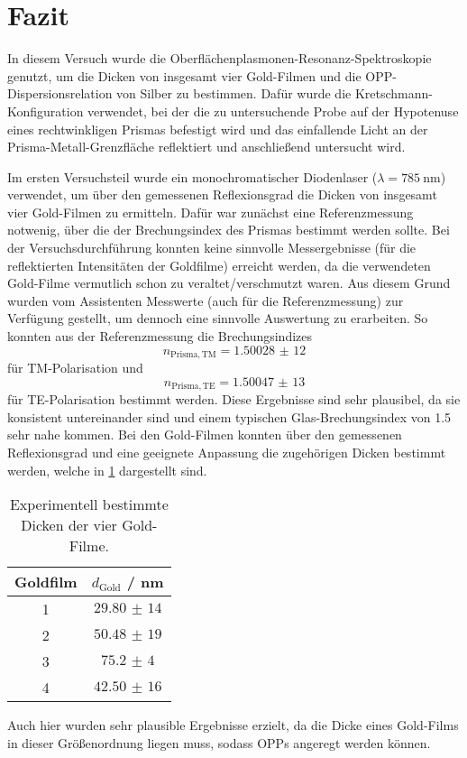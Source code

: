 \section{Fazit}\label{sec:fazit}
In diesem Versuch wurde die Oberflächenplasmonen-Resonanz-Spektroskopie genutzt, um die Dicken von insgesamt vier Gold-Filmen und
die OPP-Dispersionsrelation von Silber zu bestimmen. Dafür wurde die Kretschmann-Konfiguration verwendet, bei der die zu untersuchende
Probe auf der Hypotenuse eines rechtwinkligen Prismas befestigt wird und das einfallende Licht an der Prisma-Metall-Grenzfläche reflektiert
und anschließend untersucht wird.\par
Im ersten Versuchsteil wurde ein monochromatischer Diodenlaser ($\lambda = \SI{785}{\nm}$) verwendet, um über den gemessenen Reflexionsgrad
die Dicken von insgesamt vier Gold-Filmen zu ermitteln. Dafür war zunächst eine Referenzmessung notwenig, über die der Brechungsindex
des Prismas bestimmt werden sollte. Bei der Versuchsdurchführung konnten keine sinnvolle Messergebnisse (für die reflektierten Intensitäten der
Goldfilme) erreicht werden, da die verwendeten Gold-Filme vermutlich schon zu veraltet/verschmutzt waren. Aus diesem Grund wurden vom Assistenten
Messwerte (auch für die Referenzmessung) zur Verfügung gestellt, um dennoch eine sinnvolle Auswertung zu erarbeiten. So konnten aus der Referenzmessung
die Brechungsindizes
\begin{equation*}
    n_{\mathrm{Prisma,TM}} = \num{1,50028(12)}
\end{equation*} für TM-Polarisation und
\begin{equation*}
    n_{\mathrm{Prisma,TE}} = \num{1,50047(13)}
\end{equation*} für TE-Polarisation bestimmt werden. Diese Ergebnisse sind sehr plausibel, da sie konsistent untereinander sind und einem typischen Glas-Brechungsindex
von \num{1,5} sehr nahe kommen. Bei den Gold-Filmen konnten über den gemessenen Reflexionsgrad und eine geeignete Anpassung die zugehörigen Dicken bestimmt werden,
welche in \cref{tab:gold_fazit} dargestellt sind.
\begin{table}[H]
    \centering
    \caption{Experimentell bestimmte Dicken der vier Gold-Filme.}
    \begin{tabular}{c|c}
        Goldfilm & $d_{\mathrm{Gold}}$ / \unit{\nm} \\
        \hline
        1 & $\num{29,80(14)}$ \\
        2 & $\num{50,48(19)}$ \\
        3 & $\num{75,2(4)}$ \\
        4 & $\num{42,50(16)}$               
    \end{tabular}\label{tab:gold_fazit}
\end{table} Auch hier wurden sehr plausible Ergebnisse erzielt, da die Dicke eines Gold-Films in dieser Größenordnung liegen muss, sodass OPPs angeregt werden können.
